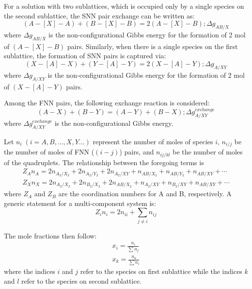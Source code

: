\begin{enumerate}
        For a solution with two sublattices, which is occupied only by a single species on the second sublattice, the SNN pair exchange can be written as:
            \begin{equation} \label{SNNPairExchange1}
	            (A-[X]-A) + (B-[X]-B) = 2(A-[X]-B); \Delta g_{AB/X}
            \end{equation} 
        where $\Delta g_{AB/X}$ is the non-configurational Gibbs energy for the formation of 2 mol of $(A-[X]-B)$ pairs. Similarly, when there is a single species on the first sublattice, the formation of SNN pairs is captured via: 
            \begin{equation} \label{SNNPairExchange2}
	            (X-[A]-X) + (Y-[A]-Y) = 2(X-[A]-Y); \Delta g_{A/XY}
            \end{equation}
        where $\Delta g_{A/XY}$ is the non-configurational Gibbs energy for the formation of 2 mol of $(X-[A]-Y)$ pairs.
        
        Among the FNN pairs, the following exchange reaction is considered:
            \begin{equation} \label{FNNPairExchange}
	            (A-X) + (B-Y) = (A-Y) + (B-X); \Delta g_{A/XY}^{exchange}
            \end{equation}
        where $\Delta g_{A/XY}^{exchange}$ is the non-configurational Gibbs energy.

        Let $n_i \; (i=A,B,...,X,Y...)$ represent the number of moles of species $i$, $n_{i/j}$ be the number of moles of FNN ($(i - j)$) pairs, and $n_{ij/kl}$ be the number of moles of the quadruplets. The relationship between the foregoing terms is \cite{Pelton01b}
        \begin{gather}\label{EqMassBalance1}
	       Z_A n_A  = 2n_{A_2/X_2} + 2n_{A_2/Y_2} + 2n_{A_2/XY} + n_{AB/X_2} + n_{AB/Y_2} + n_{AB/XY} + \cdots \\
	       Z_X n_X  = 2n_{A_2/X_2} + 2n_{B_2/X_2} + 2n_{AB/X_2} + n_{A_2/XY} + n_{B_2/XY} + n_{AB/XY} + \cdots
        \end{gather} 
        where $Z_A$ and $Z_B$ are the coordination numbers for A and B, respectively. A generic statement for a multi-component system is:
  	\begin{equation}
		Z_i n_i = 2n_{ii} + \sum_{j \ne i} n_{ij}
         \end{equation} 

        The mole fractions then follow:
        \begin{gather} \label{EqMoleFraction}
            x_{i} = \frac{n_{i}}{\sum n_j} \\
            x_{k} = \frac{n_{k}}{\sum n_l}
        \end{gather}
        where the indices $i$ and $j$ refer to the species on first sublattice while the indices $k$ and $l$ refer to the species on second sublattice.
        

\end{enumerate}
